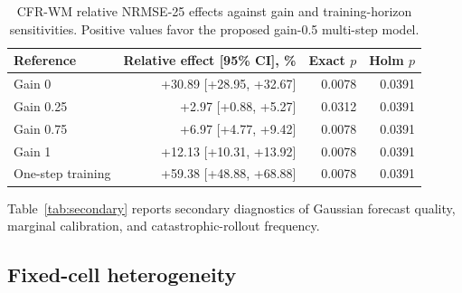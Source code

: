 \documentclass[iicol,pdflatex,sn-basic,Numbered]{sn-jnl}
\begin{document}
\begin{table}[t]
\centering
\caption{CFR-WM relative NRMSE-25 effects against gain and training-horizon
sensitivities. Positive values favor the proposed gain-0.5 multi-step model.}
\label{tab:sensitivity-contrasts}
\begin{tabular}{lrrr}
\toprule
Reference & Relative effect [95\% CI], \% & Exact $p$ & Holm $p$ \\
\midrule
Gain 0 & +30.89 [+28.95, +32.67] & 0.0078 & 0.0391 \\
Gain 0.25 & +2.97 [+0.88, +5.27] & 0.0312 & 0.0391 \\
Gain 0.75 & +6.97 [+4.77, +9.42] & 0.0078 & 0.0391 \\
Gain 1 & +12.13 [+10.31, +13.92] & 0.0078 & 0.0391 \\
One-step training & +59.38 [+48.88, +68.88] & 0.0078 & 0.0391 \\
\bottomrule
\end{tabular}
\end{table}

Table~\ref{tab:secondary} reports secondary diagnostics of Gaussian forecast
quality, marginal calibration, and catastrophic-rollout frequency.

\begin{table}[t]
\centering
\caption{Secondary aggregate diagnostics for the six broad methods. Rates and
scores are seed-balanced over all fixed cells and are not separately tested.}
\label{tab:secondary}
\end{table}

\subsection{Fixed-cell heterogeneity}
\end{document}
